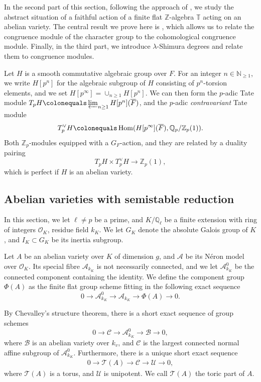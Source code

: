 \documentclass[a4paper, notitlepage, 10pt]{amsart}
\theoremstyle{plain} %
\theoremstyle{definition} %
\theoremstyle{remark} %
\numberwithin{equation}{section}
\newcommand{\bbQ}{\mathbb Q}
\newcommand{\bbT}{\mathbb T}
\newcommand{\bbZ}{\mathbb Z}
\newcommand{\Hom}{\operatorname{Hom}} %
\begin{document}
In the second part of this section, following the approach of \cite{Helm}, we study the abstract situation of a faithful action of a finite flat $\bbZ$-algebra $\bbT$ acting on an abelian variety. The central result we prove here is , which allows us to relate the congruence module of the character group to the cohomological congruence module. Finally, in the third part, we introduce $\lambda$-Shimura degrees and relate them to congruence modules.


Let $H$ is a smooth commutative algebraic group over $F$. For an integer $n\in \mathbb{N}_{\ge 1}$, we write $H[p^n]$ for the algebraic subgroup of $H$ consisting of $p^n$-torsion elements, and we set $H[p^{\infty}]=\cup_{n\ge 1}H[p^n]$. We can then form the $p$-adic Tate module $T_pH\colonequals \varprojlim_{n\ge 1} H[p^n](\overline{F})$, and the $p$-adic \textit{contravariant} Tate module $$T^\vee_pH\colonequals \Hom(H[p^{\infty}](\overline{F}),\bbQ_p/\bbZ_p(1)).$$ Both $\bbZ_p$-modules equipped with a $G_F$-action, and they are related by a duality pairing
$$ T_p H\times T_p^\vee H\to \bbZ_p(1), $$
which is perfect if $H$ is an abelian variety.

\subsection{Abelian varieties with semistable reduction}\label{ssred} In this section, we let $\ell\neq p$ be a prime, and $K/\mathbb{Q}_{\ell}$ be a finite extension with ring of integers $\mathcal{O}_K$, residue field $k_K$. We let $G_K$ denote the absolute Galois group of $K$, and $I_K\subset G_K$ be its inertia subgroup.

Let $A$ be an abelian variety over $K$ of dimension $g$, and $\mathcal{A}$ be its Néron model over $\mathcal{O}_{K}$. Its special fibre $\mathcal{A}_{k_K}$ is not necessarily connected, and we let $\mathcal{A}^0_{k_K}$ be the connected component containing the identity. We define the component group $\Phi(A)$ as the finite flat group scheme fitting in the following exact sequence
\begin{equation*}
    0 \rightarrow \mathcal{A}^0_{k_K} \rightarrow \mathcal{A}_{k_K} \rightarrow \Phi(A)\rightarrow 0.
\end{equation*}

By Chevalley's structure theorem, there is a short exact sequence of group schemes
\begin{equation*}
    0 \rightarrow \mathcal{C}\rightarrow \mathcal{A}^0_{k_K} \rightarrow \mathcal{B}\rightarrow 0,
\end{equation*}
where $\mathcal{B}$ is an abelian variety over $k_v$, and $\mathcal{C}$ is the largest connected normal affine subgroup of $\mathcal{A}^0_{k_K}$. Furthermore, there is a unique short exact sequence
\begin{align*}
    0 \rightarrow \mathcal{T}(A) \rightarrow \mathcal{C}\rightarrow \mathcal{U}\rightarrow 0,
\end{align*}
where $\mathcal{T}(A)$ is a torus, and $\mathcal{U}$ is unipotent. We call $\mathcal{T}(A)$ the toric part of $A$. 
\end{document}
